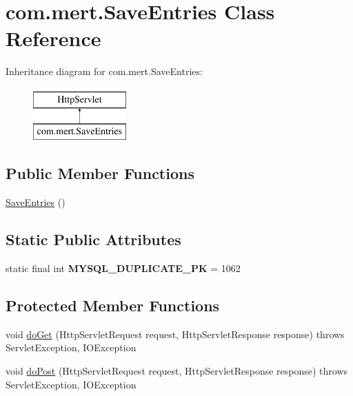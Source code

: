 \hypertarget{classcom_1_1mert_1_1_save_entries}{}\section{com.\+mert.\+Save\+Entries Class Reference}
\label{classcom_1_1mert_1_1_save_entries}
Inheritance diagram for com.\+mert.\+Save\+Entries\+:\begin{figure}[H]
\begin{center}
\leavevmode
\includegraphics[height=2.000000cm]{classcom_1_1mert_1_1_save_entries}
\end{center}
\end{figure}
\subsection*{Public Member Functions}
\begin{DoxyCompactItemize}
\item 
\hyperlink{classcom_1_1mert_1_1_save_entries_ae19968edd5aa3639abbf947ec2f82caf}{Save\+Entries} ()
\end{DoxyCompactItemize}
\subsection*{Static Public Attributes}
\begin{DoxyCompactItemize}
\item 
static final int {\bfseries M\+Y\+S\+Q\+L\+\_\+\+D\+U\+P\+L\+I\+C\+A\+T\+E\+\_\+\+PK} = 1062\hypertarget{classcom_1_1mert_1_1_save_entries_a00c72d5c09233f18a2ad4f9bf2f28194}{}\label{classcom_1_1mert_1_1_save_entries_a00c72d5c09233f18a2ad4f9bf2f28194}

\end{DoxyCompactItemize}
\subsection*{Protected Member Functions}
\begin{DoxyCompactItemize}
\item 
void \hyperlink{classcom_1_1mert_1_1_save_entries_a5fff9e9797d0c58897db11c3a343f9c4}{do\+Get} (Http\+Servlet\+Request request, Http\+Servlet\+Response response)  throws Servlet\+Exception, I\+O\+Exception 
\item 
void \hyperlink{classcom_1_1mert_1_1_save_entries_ad7a78cb05ce7e6fcbb17e4046d5f2765}{do\+Post} (Http\+Servlet\+Request request, Http\+Servlet\+Response response)  throws Servlet\+Exception, I\+O\+Exception 
\end{DoxyCompactItemize}


